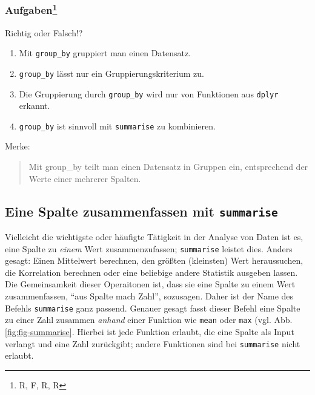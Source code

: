 \documentclass[12pt,ngerman,]{book}
\providecommand{\tightlist}{%
  \setlength{\itemsep}{0pt}\setlength{\parskip}{0pt}}
\let\rmarkdownfootnote\footnote%
\def\footnote{\protect\rmarkdownfootnote}
\let\BeginKnitrBlock\begin \let\EndKnitrBlock\end
\begin{document}
\subsubsection[Aufgaben]{\texorpdfstring{Aufgaben\footnote{R, F, R, R}}{Aufgaben}}\label{aufgaben-6}

\BeginKnitrBlock{rmdexercises}
Richtig oder Falsch!?

\begin{enumerate}
\def\labelenumi{\arabic{enumi}.}
\tightlist
\item
  Mit \texttt{group\_by} gruppiert man einen Datensatz.
\item
  \texttt{group\_by} lässt nur ein Gruppierungskriterium zu.
\item
  Die Gruppierung durch \texttt{group\_by} wird nur von Funktionen aus
  \texttt{dplyr} erkannt.
\item
  \texttt{group\_by} ist sinnvoll mit \texttt{summarise} zu kombinieren.
\end{enumerate}
\EndKnitrBlock{rmdexercises}

Merke:

\begin{quote}
Mit group\_by teilt man einen Datensatz in Gruppen ein, entsprechend der
Werte einer mehrerer Spalten.
\end{quote}

\subsection{\texorpdfstring{Eine Spalte zusammenfassen mit
\texttt{summarise}}{Eine Spalte zusammenfassen mit summarise}}\label{eine-spalte-zusammenfassen-mit-summarise}

Vielleicht die wichtigste oder häufigte Tätigkeit in der Analyse von
Daten ist es, eine Spalte zu \emph{einem} Wert zusammenzufassen;
\texttt{summarise} leistet dies. Anders gesagt:
Einen Mittelwert berechnen, den größten (kleinsten) Wert heraussuchen,
die Korrelation berechnen oder eine beliebige andere Statistik ausgeben
lassen. Die Gemeinsamkeit dieser Operaitonen ist, dass sie eine Spalte
zu einem Wert zusammenfassen, ``aus Spalte mach Zahl'', sozusagen. Daher
ist der Name des Befehls \texttt{summarise} ganz passend. Genauer gesagt
fasst dieser Befehl eine Spalte zu einer Zahl zusammen \emph{anhand}
einer Funktion wie \texttt{mean} oder \texttt{max} (vgl. Abb.
\ref{fig:fig-summarise}. Hierbei ist jede Funktion erlaubt, die eine
Spalte als Input verlangt und eine Zahl zurückgibt; andere Funktionen
sind bei \texttt{summarise} nicht erlaubt.
\end{document}
